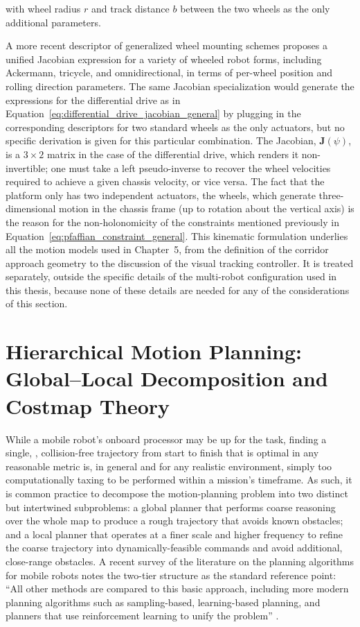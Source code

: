 with wheel radius $r$ and track distance $b$ between the two wheels as the only additional parameters.

A more recent descriptor of generalized wheel mounting schemes \cite{pantoja2026generalized} proposes a unified Jacobian expression for a variety of wheeled robot forms, including Ackermann, tricycle, and omnidirectional, in terms of per-wheel position and rolling direction parameters. The same Jacobian specialization would generate the expressions for the differential drive as in Equation~\eqref{eq:differential_drive_jacobian_general} by plugging in the corresponding descriptors for two standard wheels as the only actuators, but no specific derivation is given for this particular combination. The Jacobian, $\mathbf{J}(\psi)$, is a $3 \times 2$ matrix in the case of the differential drive, which renders it non-invertible; one must take a left pseudo-inverse to recover the wheel velocities required to achieve a given chassis velocity, or vice versa. The fact that the platform only has two independent actuators, the wheels, which generate three-dimensional motion in the chassis frame (up to rotation about the vertical axis) is the reason for the non-holonomicity of the constraints mentioned previously in Equation~\eqref{eq:pfaffian_constraint_general}. This kinematic formulation underlies all the motion models used in Chapter~5, from the definition of the corridor approach geometry to the discussion of the visual tracking controller. It is treated separately, outside the specific details of the multi-robot configuration used in this thesis, because none of these details are needed for any of the considerations of this section.

\section{Hierarchical Motion Planning: Global--Local Decomposition and Costmap Theory}

While a mobile robot's onboard processor may be up for the task, finding a single, , collision-free trajectory from start to finish that is optimal in any reasonable metric is, in general and for any realistic environment, simply too computationally taxing to be performed within a mission's timeframe. As such, it is common practice to decompose the motion-planning problem into two distinct but intertwined subproblems: a global planner that performs coarse reasoning over the whole map to produce a rough trajectory that avoids known obstacles; and a local planner that operates at a finer scale and higher frequency to refine the coarse trajectory into dynamically-feasible commands and avoid additional, close-range obstacles. A recent survey of the literature on the planning algorithms for mobile robots notes the two-tier structure as the standard reference point: ``All other methods are compared to this basic approach, including more modern planning algorithms such as sampling-based, learning-based planning, and planners that use reinforcement learning to unify the problem'' \cite{dong2023review}.

